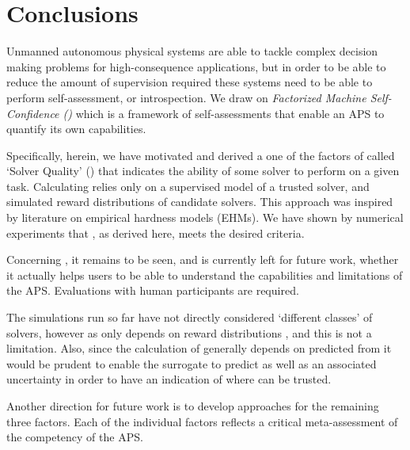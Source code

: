\section{Conclusions} \label{sec:conclusions}
Unmanned autonomous physical systems are able to tackle complex decision making problems for high-consequence applications, but in order to be able to reduce the amount of supervision required these systems need to be able to perform self-assessment, or introspection. We draw on \emph{Factorized Machine Self-Confidence (\famsec)} which is a framework of self-assessments that enable an APS to quantify its own capabilities.

Specifically, herein, we have motivated and derived a one of the factors of \famsec{} called `Solver Quality' (\xQ) that indicates the ability of some solver to perform on a given task. Calculating \xQ{} relies only on a supervised model of a trusted solver, and simulated reward distributions of candidate solvers. This approach was inspired by literature on empirical hardness models (EHMs). We have shown by numerical experiments that \xQ{}, as derived here, meets the desired criteria.

Concerning \xQ{}, it remains to be seen, and is currently left for future work, whether it actually helps users to be able to understand the capabilities and limitations of the APS. Evaluations with human participants are required.

The simulations run so far have not directly considered `different classes' of solvers, however as \xQ{} only depends on reward distributions \rwd{}, and \rwdstar{} this is not a limitation. Also, since the calculation of \xQ{} generally depends on \rwdstar{} predicted from \surrogate{} it would be prudent to enable the surrogate to predict \rwdstar{} as well as an associated uncertainty in order to have an indication of where \surrogate{} can be trusted.

Another direction for future work is to develop approaches for the remaining three \famsec{} factors. Each of the individual factors reflects a critical meta-assessment of the competency of the APS.
